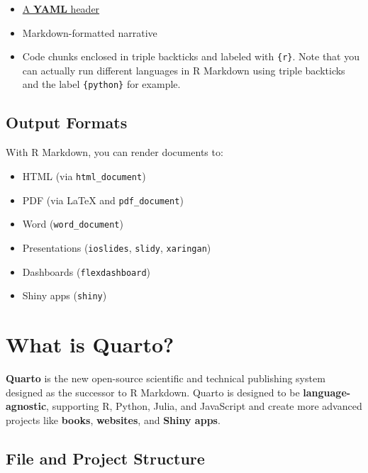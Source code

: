 \documentclass[
  letterpaper,
  DIV=11,
  numbers=noendperiod]{scrartcl}
\providecommand{\tightlist}{%
  \setlength{\itemsep}{0pt}\setlength{\parskip}{0pt}}\usepackage{longtable,booktabs,array}
\begin{document}
\begin{itemize}
\tightlist
\item
  \href{https://monashdatafluency.github.io/r-rep-res/yaml-header.html}{A
  \textbf{YAML} header}
\item
  Markdown-formatted narrative
\item
  Code chunks enclosed in triple backticks and labeled with
  \texttt{\{r\}}. Note that you can actually run different languages in
  R Markdown using triple backticks and the label \texttt{\{python\}}
  for example.
\end{itemize}

\hypertarget{output-formats}{%
\subsection{Output Formats}\label{output-formats}}

With R Markdown, you can render documents to:

\begin{itemize}
\tightlist
\item
  HTML (via \texttt{html\_document})
\item
  PDF (via LaTeX and \texttt{pdf\_document})
\item
  Word (\texttt{word\_document})
\item
  Presentations (\texttt{ioslides}, \texttt{slidy}, \texttt{xaringan})
\item
  Dashboards (\texttt{flexdashboard})
\item
  Shiny apps (\texttt{shiny})
\end{itemize}

\hypertarget{what-is-quarto}{%
\section{What is Quarto?}\label{what-is-quarto}}

\textbf{Quarto} is the new open-source scientific and technical
publishing system designed as the successor to R Markdown. Quarto is
designed to be \textbf{language-agnostic}, supporting R, Python, Julia,
and JavaScript and create more advanced projects like \textbf{books},
\textbf{websites}, and \textbf{Shiny apps}.

\hypertarget{file-and-project-structure}{%
\subsection{File and Project
Structure}\label{file-and-project-structure}}
\end{document}

